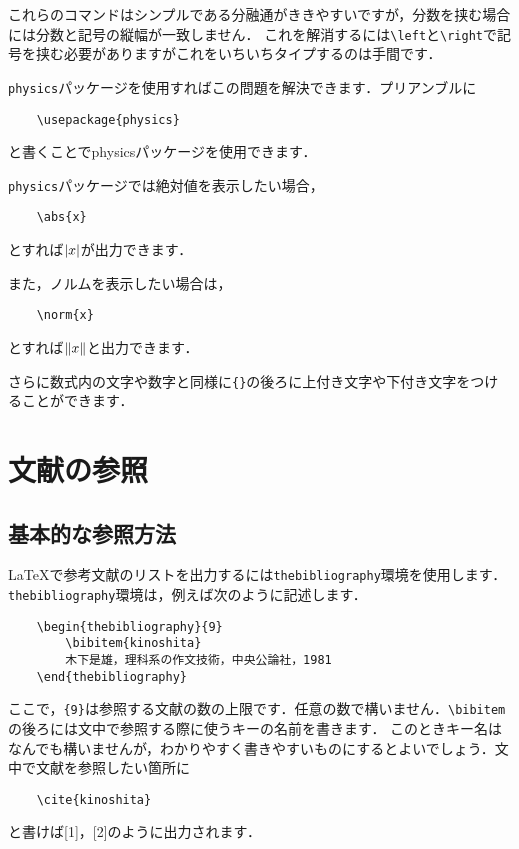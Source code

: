 \documentclass[a4paper,11pt]{jsreport}
\numberwithin{equation}{section}
\theoremstyle{definition}
\begin{document}
これらのコマンドはシンプルである分融通がききやすいですが，分数を挟む場合には分数と記号の縦幅が一致しません．
これを解消するには\verb|\left|と\verb|\right|で記号を挟む必要がありますがこれをいちいちタイプするのは手間です．

\verb|physics|パッケージを使用すればこの問題を解決できます．プリアンブルに
\begin{verbatim}
    \usepackage{physics}
\end{verbatim}
と書くことでphysicsパッケージを使用できます．

\verb|physics|パッケージでは絶対値を表示したい場合，
\begin{verbatim}
    \abs{x}
\end{verbatim}
とすれば$\abs{x}$が出力できます．

また，ノルムを表示したい場合は，
\begin{verbatim}
    \norm{x}
\end{verbatim}
とすれば$\norm{x}$と出力できます．

さらに数式内の文字や数字と同様に\verb|{}|の後ろに上付き文字や下付き文字をつけることができます．

\chapter{文献の参照}

\section{基本的な参照方法}

\LaTeX で参考文献のリストを出力するには\verb|thebibliography|環境を使用します\cite{bibunsyo}．
\verb|thebibliography|環境は，例えば次のように記述します．
\begin{verbatim}
    \begin{thebibliography}{9}
        \bibitem{kinoshita}
        木下是雄，理科系の作文技術，中央公論社，1981
    \end{thebibliography}
\end{verbatim}

ここで，\verb|{9}|は参照する文献の数の上限です．任意の数で構いません．\verb|\bibitem|の後ろには文中で参照する際に使うキーの名前を書きます．
このときキー名はなんでも構いませんが，わかりやすく書きやすいものにするとよいでしょう．文中で文献を参照したい箇所に
\begin{verbatim}
    \cite{kinoshita}
\end{verbatim}
と書けば[1]，[2]のように出力されます．
\end{document}
